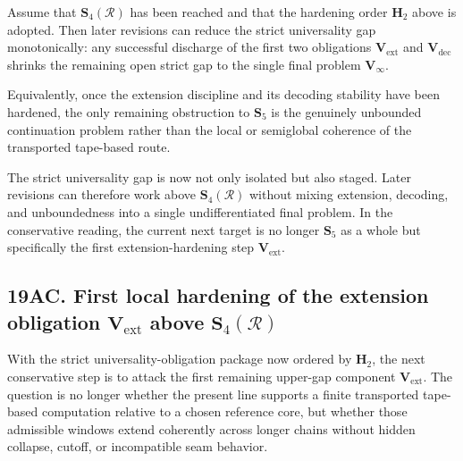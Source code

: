 \begin{proposition}
Assume that \(\mathbf S_4(\mathcal R)\) has been reached and that the hardening order \(\mathbf H_2\) above is adopted. Then later revisions can reduce the strict universality gap monotonically: any successful discharge of the first two obligations \(\mathbf V_{\mathrm{ext}}\) and \(\mathbf V_{\mathrm{dec}}\) shrinks the remaining open strict gap to the single final problem \(\mathbf V_\infty\).

Equivalently, once the extension discipline and its decoding stability have been hardened, the only remaining obstruction to \(\mathbf S_5\) is the genuinely unbounded continuation problem rather than the local or semiglobal coherence of the transported tape-based route.
\end{proposition}

\begin{corollary}
The strict universality gap is now not only isolated but also staged. Later revisions can therefore work above \(\mathbf S_4(\mathcal R)\) without mixing extension, decoding, and unboundedness into a single undifferentiated final problem. In the conservative reading, the current next target is no longer \(\mathbf S_5\) as a whole but specifically the first extension-hardening step \(\mathbf V_{\mathrm{ext}}\).
\end{corollary}


\subsection*{19AC. First local hardening of the extension obligation \(\mathbf V_{\mathrm{ext}}\) above \(\mathbf S_4(\mathcal R)\)}
With the strict universality-obligation package now ordered by \(\mathbf H_2\), the next conservative step is to attack the first remaining upper-gap component \(\mathbf V_{\mathrm{ext}}\). The question is no longer whether the present line supports a finite transported tape-based computation relative to a chosen reference core, but whether those admissible windows extend coherently across longer chains without hidden collapse, cutoff, or incompatible seam behavior.

